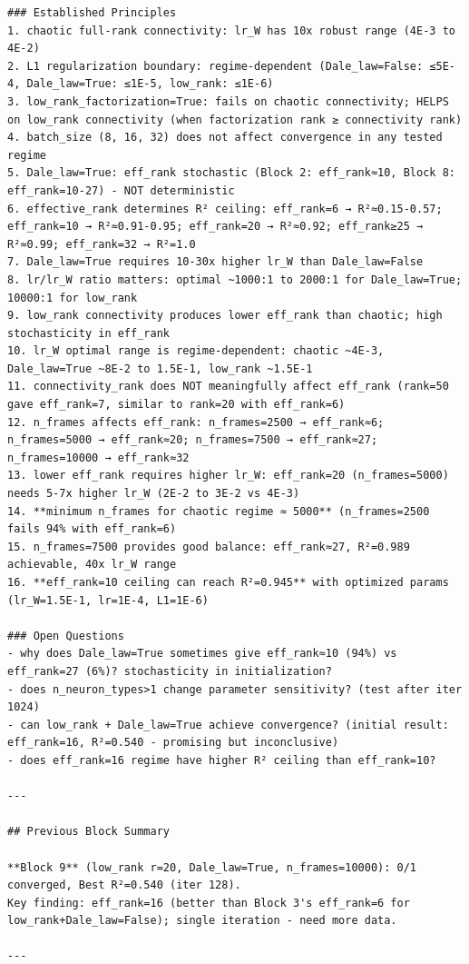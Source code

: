 \documentclass[10pt,twocolumn]{article}
\begin{document}
\begin{small}
\begin{verbatim}
### Established Principles
1. chaotic full-rank connectivity: lr_W has 10x robust range (4E-3 to 4E-2)
2. L1 regularization boundary: regime-dependent (Dale_law=False: ≤5E-4, Dale_law=True: ≤1E-5, low_rank: ≤1E-6)
3. low_rank_factorization=True: fails on chaotic connectivity; HELPS on low_rank connectivity (when factorization rank ≥ connectivity rank)
4. batch_size (8, 16, 32) does not affect convergence in any tested regime
5. Dale_law=True: eff_rank stochastic (Block 2: eff_rank≈10, Block 8: eff_rank=10-27) - NOT deterministic
6. effective_rank determines R² ceiling: eff_rank=6 → R²≈0.15-0.57; eff_rank=10 → R²≈0.91-0.95; eff_rank=20 → R²≈0.92; eff_rank≥25 → R²≈0.99; eff_rank=32 → R²=1.0
7. Dale_law=True requires 10-30x higher lr_W than Dale_law=False
8. lr/lr_W ratio matters: optimal ~1000:1 to 2000:1 for Dale_law=True; 10000:1 for low_rank
9. low_rank connectivity produces lower eff_rank than chaotic; high stochasticity in eff_rank
10. lr_W optimal range is regime-dependent: chaotic ~4E-3, Dale_law=True ~8E-2 to 1.5E-1, low_rank ~1.5E-1
11. connectivity_rank does NOT meaningfully affect eff_rank (rank=50 gave eff_rank=7, similar to rank=20 with eff_rank=6)
12. n_frames affects eff_rank: n_frames=2500 → eff_rank≈6; n_frames=5000 → eff_rank≈20; n_frames=7500 → eff_rank≈27; n_frames=10000 → eff_rank≈32
13. lower eff_rank requires higher lr_W: eff_rank=20 (n_frames=5000) needs 5-7x higher lr_W (2E-2 to 3E-2 vs 4E-3)
14. **minimum n_frames for chaotic regime ≈ 5000** (n_frames=2500 fails 94% with eff_rank=6)
15. n_frames=7500 provides good balance: eff_rank≈27, R²=0.989 achievable, 40x lr_W range
16. **eff_rank=10 ceiling can reach R²=0.945** with optimized params (lr_W=1.5E-1, lr=1E-4, L1=1E-6)

### Open Questions
- why does Dale_law=True sometimes give eff_rank≈10 (94%) vs eff_rank=27 (6%)? stochasticity in initialization?
- does n_neuron_types>1 change parameter sensitivity? (test after iter 1024)
- can low_rank + Dale_law=True achieve convergence? (initial result: eff_rank=16, R²=0.540 - promising but inconclusive)
- does eff_rank=16 regime have higher R² ceiling than eff_rank=10?

---

## Previous Block Summary

**Block 9** (low_rank r=20, Dale_law=True, n_frames=10000): 0/1 converged, Best R²=0.540 (iter 128).
Key finding: eff_rank=16 (better than Block 3's eff_rank=6 for low_rank+Dale_law=False); single iteration - need more data.

---


\end{verbatim}
\end{small}
\end{document}
